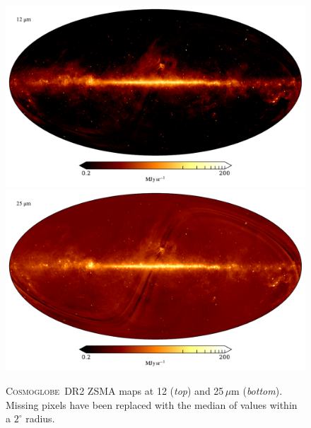 \documentclass{aa}
\newcommand{\cosmoglobe}{\textsc{Cosmoglobe}}
\begin{document}
\begin{figure}
	\centering
	\includegraphics[width=\linewidth]{figs/map_05.pdf}\\
	\includegraphics[width=\linewidth]{figs/map_06.pdf}
	\caption{\cosmoglobe\ DR2 ZSMA maps at 12 (\emph{top}) and
          25$\,\mu$m (\emph{bottom}). Missing pixels have been replaced with
          the median of values within a $2^\circ$ radius.}
	\label{fig:freqmaps5_6}
\end{figure}
\end{document}
